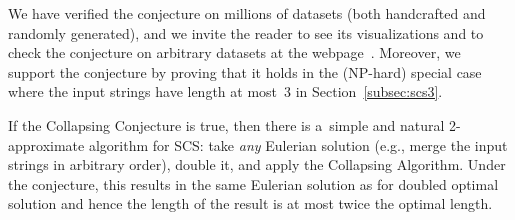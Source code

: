 We have verified the conjecture on millions of datasets (both handcrafted and randomly generated), and we invite the reader to see its visualizations and to check the conjecture on arbitrary datasets at the webpage~\cite{webpage}. 
Moreover, 
we support the conjecture by proving that it holds in the (NP-hard) special case where the input strings have length at most~3 in Section~\ref{subsec:scs3}.

If the Collapsing Conjecture is true, then there is a~simple and natural 2-approximate algorithm for SCS: take {\em any} Eulerian solution (e.g., merge the input strings in arbitrary order), double it, and apply the Collapsing Algorithm. Under the conjecture, this results in the same Eulerian solution as for doubled optimal solution and hence the length of the result is at most twice the optimal length.




